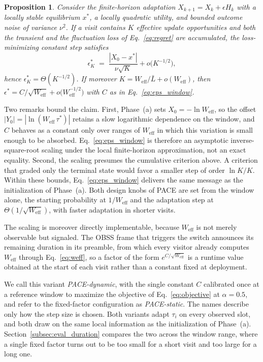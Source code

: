 \documentclass[journal,10pt]{IEEEtran}
\newtheorem{proposition}{Proposition}
\begin{document}
\begin{proposition}
Consider the finite-horizon adaptation $X_{k+1}=X_k+\epsilon H_k$ with a locally stable equilibrium $x^*$, a locally quadratic utility, and bounded outcome noise of variance $\nu^2$. If a visit contains $K$ effective update opportunities and both the transient and the fluctuation loss of Eq.~\eqref{eq:regret} are accumulated, the loss-minimizing constant step satisfies
\begin{equation}
    \epsilon^*_K \;=\; \frac{|X_0-x^*|}{\nu\sqrt{K}} + o\bigl(K^{-1/2}\bigr),
\end{equation}
hence $\epsilon^*_K=\Theta(K^{-1/2})$. If moreover $K=W_\mathrm{eff}/\bar{L}+o(W_\mathrm{eff})$, then $\epsilon^*=C/\sqrt{W_\mathrm{eff}}+o\bigl(W_\mathrm{eff}^{-1/2}\bigr)$ with $C$ as in Eq.~\eqref{eq:eps_window}.
\end{proposition}

Two remarks bound the claim. First, Phase~(a) sets $X_0=-\ln W_\mathrm{eff}$, so the offset $|Y_0|=|\ln(W_\mathrm{eff}\,\tau^*)|$ retains a slow logarithmic dependence on the window, and $C$ behaves as a constant only over ranges of $W_\mathrm{eff}$ in which this variation is small enough to be absorbed. Eq.~\eqref{eq:eps_window} is therefore an asymptotic inverse-square-root scaling under the local finite-horizon approximation, not an exact equality. Second, the scaling presumes the cumulative criterion above. A criterion that graded only the terminal state would favor a smaller step of order $\ln K/K$. Within these bounds, Eq.~\eqref{eq:eps_window} delivers the same message as the initialization of Phase~(a). Both design knobs of PACE are set from the window alone, the starting probability at $1/W_\mathrm{eff}$ and the adaptation step at $\Theta(1/\sqrt{W_\mathrm{eff}})$, with faster adaptation in shorter visits.

The scaling is moreover directly implementable, because $W_\mathrm{eff}$ is not merely observable but signaled. The OBSS frame that triggers the switch announces its remaining duration in its preamble, from which every visitor already computes $W_\mathrm{eff}$ through Eq.~\eqref{eq:weff}, so a factor of the form $e^{C/\sqrt{W_\mathrm{eff}}}$ is a runtime value obtained at the start of each visit rather than a constant fixed at deployment. 

We call this variant \emph{PACE-dynamic}, with the single constant $C$ calibrated once at a reference window to maximize the objective of Eq.~\eqref{eq:objective} at $\alpha=0.5$, and refer to the fixed-factor configuration as \emph{PACE-static}. The names describe only how the step size is chosen. Both variants adapt $\tau_i$ on every observed slot, and both draw on the same local information as the initialization of Phase~(a). Section~\ref{subsec:eval_duration} compares the two across the window range, where a single fixed factor turns out to be too small for a short visit and too large for a long one.
\end{document}
